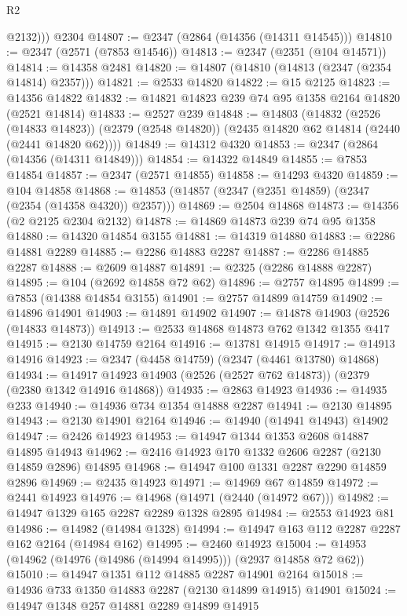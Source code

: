 \begin{lexlean}{R2}
\begin{coremodule}
          @2132)))
    @2304
@14807 := @2347 (@2864 (@14356 (@14311 @14545)))
@14810 := @2347 (@2571 (@7853 @14546))
@14813 := @2347 (@2351 (@104 @14571))
@14814 := @14358 @2481
@14820 := @14807 (@14810 (@14813 (@2347 (@2354 @14814) @2357)))
@14821 := @2533 @14820
@14822 := @15 @2125
@14823 := @14356 @14822
@14832 := @14821 @14823 @239 @74 @95 @1358 @2164 @14820 (@2521 @14814)
@14833 := @2527 @239
@14848 := @14803
    (@14832
      (@2526 (@14833 @14823))
      (@2379 (@2548 @14820))
      (@2435 @14820 @62 @14814 (@2440 (@2441 @14820 @62))))
@14849 := @14312 @4320
@14853 := @2347 (@2864 (@14356 (@14311 @14849)))
@14854 := @14322 @14849
@14855 := @7853 @14854
@14857 := @2347 (@2571 @14855)
@14858 := @14293 @4320
@14859 := @104 @14858
@14868 := @14853 (@14857 (@2347 (@2351 @14859) (@2347 (@2354 (@14358 @4320)) @2357)))
@14869 := @2504 @14868
@14873 := @14356 (@2 @2125 @2304 @2132)
@14878 := @14869 @14873 @239 @74 @95 @1358
@14880 := @14320 @14854 @3155
@14881 := @14319 @14880
@14883 := @2286 @14881 @2289
@14885 := @2286 @14883 @2287
@14887 := @2286 @14885 @2287
@14888 := @2609 @14887
@14891 := @2325 (@2286 @14888 @2287)
@14895 := @104 (@2692 @14858 @72 @62)
@14896 := @2757 @14895
@14899 := @7853 (@14388 @14854 @3155)
@14901 := @2757 @14899 @14759
@14902 := @14896 @14901
@14903 := @14891 @14902
@14907 := @14878 @14903 (@2526 (@14833 @14873))
@14913 := @2533 @14868 @14873 @762 @1342 @1355 @417
@14915 := @2130 @14759 @2164
@14916 := @13781 @14915
@14917 := @14913 @14916
@14923 := @2347 (@4458 @14759) (@2347 (@4461 @13780) @14868)
@14934 := @14917 @14923 @14903 (@2526 (@2527 @762 @14873)) (@2379 (@2380 @1342 @14916 @14868))
@14935 := @2863 @14923
@14936 := @14935 @233
@14940 := @14936 @734 @1354 @14888 @2287
@14941 := @2130 @14895
@14943 := @2130 @14901 @2164
@14946 := @14940 (@14941 @14943) @14902
@14947 := @2426 @14923
@14953 := @14947 @1344 @1353 @2608 @14887 @14895 @14943
@14962 := @2416 @14923 @170 @1332 @2606 @2287 (@2130 @14859 @2896) @14895
@14968 := @14947 @100 @1331 @2287 @2290 @14859 @2896
@14969 := @2435 @14923
@14971 := @14969 @67 @14859
@14972 := @2441 @14923
@14976 := @14968 (@14971 (@2440 (@14972 @67)))
@14982 := @14947 @1329 @165 @2287 @2289 @1328 @2895
@14984 := @2553 @14923 @81
@14986 := @14982 (@14984 @1328)
@14994 := @14947 @163 @112 @2287 @2287 @162 @2164 (@14984 @162)
@14995 := @2460 @14923
@15004 := @14953 (@14962 (@14976 (@14986 (@14994 @14995))) (@2937 @14858 @72 @62))
@15010 := @14947 @1351 @112 @14885 @2287 @14901 @2164
@15018 := @14936 @733 @1350 @14883 @2287 (@2130 @14899 @14915) @14901
@15024 := @14947 @1348 @257 @14881 @2289 @14899 @14915

\end{coremodule}
\end{lexlean}

